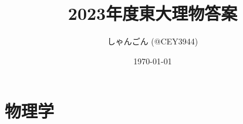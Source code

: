 \documentclass[11pt,dvipdfmx,a4paper]{jsreport}
\title{2023年度東大理物答案}
\author{しゃんごん (@CEY3944)}
\date{\today}
\numberwithin{equation}{subsection} %
\begin{document}

\maketitle

\clearpage
\chapter*{物理学}
% 
% 
% 

\end{document}
